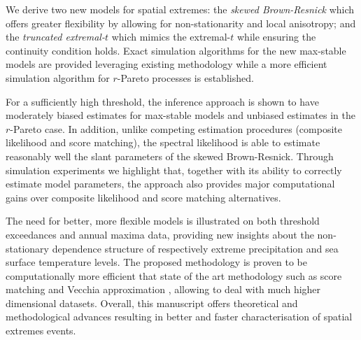 \documentclass[12pt]{article}
\begin{document}
We derive two new models for spatial extremes: the \emph{skewed Brown-Resnick} which offers greater flexibility by allowing for non-stationarity and local anisotropy; and the \emph{truncated extremal-$t$} which mimics the extremal-$t$ while ensuring the continuity condition holds. Exact simulation algorithms for the new max-stable models are provided leveraging existing methodology while a more efficient simulation algorithm for $r$-Pareto processes is established. 

For a sufficiently high threshold, the inference approach is shown to have moderately biased estimates for max-stable models and unbiased estimates in the $r$-Pareto case. In addition, unlike competing estimation procedures (composite likelihood and score matching), the spectral likelihood is able to estimate reasonably well the slant parameters of the skewed Brown-Resnick. Through simulation experiments we highlight that, together with its ability to correctly estimate model parameters, the approach also provides major computational gains over composite likelihood and score matching alternatives.

The need for better, more flexible models is illustrated on both threshold exceedances and annual maxima data, providing new insights about the non-stationary dependence structure of respectively extreme precipitation and sea surface temperature levels. The proposed methodology is proven to be computationally more efficient that state of the art methodology such as score matching \citep{deFondeville.Davison:2018} and Vecchia approximation \citep{Huser.Zhong:2023}, allowing to deal with much higher dimensional datasets. Overall, this manuscript offers theoretical and methodological advances resulting in better and faster characterisation of spatial extremes events.


\end{document}
